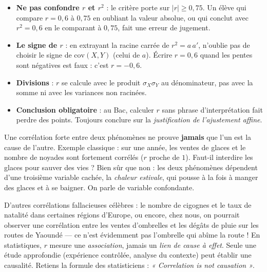 \documentclass[11pt]{article}
\newcommand{\cle}[1]{{\popxbold\color{popdark}#1}}
\begin{document}
\begin{attention}
\begin{itemize}
\item \textbf{Ne pas confondre $r$ et $r^2$} : le critère porte sur $|r| \geq 0{,}75$. Un élève qui compare $r = 0{,}6$ à $0{,}75$ en oubliant la valeur absolue, ou qui conclut avec $r^2 = 0{,}6$ en le comparant à $0{,}75$, fait une erreur de jugement.
\item \textbf{Le signe de $r$} : en extrayant la racine carrée de $r^2 = a\,a'$, n'oublie pas de choisir le signe de $\mathrm{cov}(X,Y)$ (celui de $a$). Écrire $r = 0{,}6$ quand les pentes sont négatives est faux : c'est $r = -0{,}6$.
\item \textbf{Divisions} : $r$ se calcule avec le produit $\sigma_X \sigma_Y$ au dénominateur, pas avec la somme ni avec les variances non racinées.
\item \textbf{Conclusion obligatoire} : au Bac, calculer $r$ sans phrase d'interprétation fait perdre des points. Toujours conclure sur la \emph{justification de l'ajustement affine}.
\end{itemize}
\end{attention}

\begin{savaistu}
Une corrélation forte entre deux phénomènes ne prouve \textbf{jamais} que l'un est la cause de l'autre. Exemple classique : sur une année, les ventes de glaces et le nombre de noyades sont fortement corrélés ($r$ proche de $1$). Faut-il interdire les glaces pour sauver des vies ? Bien sûr que non : les deux phénomènes dépendent d'une troisième variable cachée, la \emph{chaleur estivale}, qui pousse à la fois à manger des glaces et à se baigner. On parle de \cle{variable confondante}.

D'autres corrélations fallacieuses célèbres : le nombre de cigognes et le taux de natalité dans certaines régions d'Europe, ou encore, chez nous, on pourrait observer une corrélation entre les ventes d'ombrelles et les dégâts de pluie sur les routes de Yaoundé — ce n'est évidemment pas l'ombrelle qui abîme la route ! En statistiques, $r$ mesure une \emph{association}, jamais un \emph{lien de cause à effet}. Seule une étude approfondie (expérience contrôlée, analyse du contexte) peut établir une causalité. Retiens la formule des statisticiens : \emph{« Correlation is not causation »}.
\end{savaistu}
\end{document}
